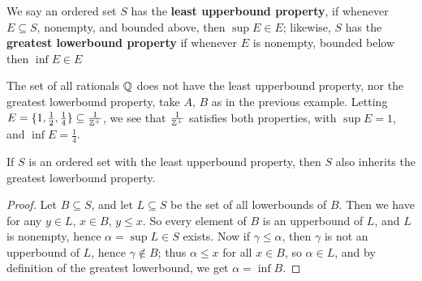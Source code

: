 \begin{definition}
    We say an ordered set $S$ has the \textbf{least upperbound property}, if whenever 
    $E \subseteq S$, nonempty, and bounded above, then  $\sup{E} \in E$; likewise, $S$ has 
    the \textbf{greatest lowerbound property} if whenever $E$ is nonempty, bounded below 
    then $\inf{E} \in E$
\end{definition}

\begin{example}
    The set of all rationals $\mathbb{Q}$ does not have the least upperbound property, nor the 
    greatest lowerbound property, take $A$,  $B$ as in the previous example. Letting  
    $E=\{1, \frac{1}{2}, \frac{1}{4}\} \subseteq \frac{1}{\mathbb{Z}^+}$, we see that $\frac{1}{\mathbb{Z}^+}$ 
    satisfies both properties, with $\sup{E}=1$, and  $\inf{E}=\frac{1}{4}$.
\end{example} 

\begin{theorem}\label{1.1.2}
    If $S$ is an ordered set with the least upperbound property, then $S$ also inherits 
    the greatest lowerbound property.
\end{theorem}
\begin{proof}
    Let $B \subseteq S$, and let  $L \subseteq S$ be the set of all lowerbounds of $B$. Then we have 
    for any $y \in L$, $x \in B$, $y \leq x$. So every element of  $B$ is an upperbound of  $L$, and 
    $L$ is nonempty, hence $\alpha=\sup{L} \in S$ exists. Now if  $\gamma \leq \alpha$, then 
     $\gamma$ is not an upperbound of  $L$, hence  $\gamma \notin B$; thus  $\alpha \leq x$ for all 
      $x \in B$, so  $\alpha \in L$, and by definition of the greatest lowerbound, we get 
      $\alpha=\inf{B}$.
\end{proof}

